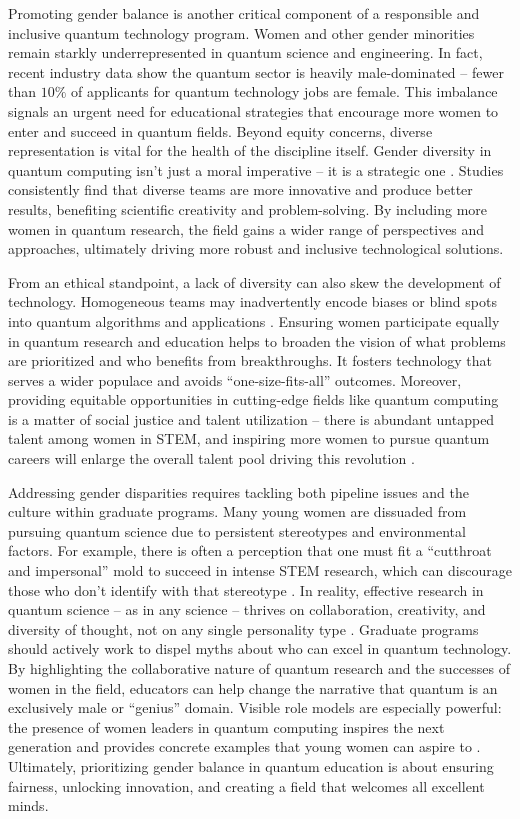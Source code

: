 \documentclass{scrreprt}
\begin{document}
Promoting gender balance is another critical component of a
responsible and inclusive quantum technology program. Women and other
gender minorities remain starkly underrepresented in quantum science
and engineering. In fact, recent industry data show the quantum sector
is heavily male-dominated – fewer than $10\%$ of applicants for quantum
technology jobs are female. This imbalance signals an urgent need for
educational strategies that encourage more women to enter and succeed
in quantum fields. Beyond equity concerns, diverse representation is
vital for the health of the discipline itself. Gender diversity in
quantum computing isn’t just a moral imperative – it is  a strategic one
. Studies consistently find that diverse teams are more innovative and
produce better results, benefiting scientific creativity and
problem-solving. By including more women in quantum research, the field
gains a wider range of perspectives and approaches, ultimately driving
more robust and inclusive technological solutions.


From an ethical standpoint, a lack of diversity can also skew the
development of technology. Homogeneous teams may inadvertently encode
biases or blind spots into quantum algorithms and applications
. Ensuring women participate equally in quantum research and education
helps to broaden the vision of what problems are prioritized and who
benefits from breakthroughs. It fosters technology that serves a wider
populace and avoids “one-size-fits-all” outcomes. Moreover, providing
equitable opportunities in cutting-edge fields like quantum computing
is a matter of social justice and talent utilization – there is
abundant untapped talent among women in STEM, and inspiring more women
to pursue quantum careers will enlarge the overall talent pool driving
this revolution .



Addressing gender disparities requires tackling both pipeline issues
and the culture within graduate programs. Many young women are
dissuaded from pursuing quantum science due to persistent stereotypes
and environmental factors. For example, there is often a perception
that one must fit a “cutthroat and impersonal” mold to succeed in
intense STEM research, which can discourage those who don’t identify
with that stereotype . In reality, effective research in quantum
science – as in any science – thrives on collaboration, creativity,
and diversity of thought, not on any single personality type
. Graduate programs should actively work to dispel myths about who can
excel in quantum technology. By highlighting the collaborative nature
of quantum research and the successes of women in the field, educators
can help change the narrative that quantum is an exclusively male or
“genius” domain. Visible role models are especially powerful: the
presence of women leaders in quantum computing inspires the next
generation and provides concrete examples that young women can aspire
to . Ultimately, prioritizing gender balance in quantum education is
about ensuring fairness, unlocking innovation, and creating a field
that welcomes all excellent minds.
\end{document}
